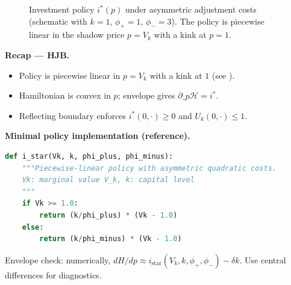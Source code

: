 \documentclass[11pt,letterpaper,oneside]{article}
\numberwithin{equation}{section}
\newcommand{\1}{\mathbf{1}}
\begin{document}
\begin{figure}[ht]
\centering
{}
\caption{Investment policy $i^*(p)$ under asymmetric adjustment costs (schematic with $k=1$, $\phi_+=1$, $\phi_-=3$). The policy is piecewise linear in the shadow price $p=V_k$ with a kink at $p=1$.}
\label{fig:policy_ip}
\end{figure}

\begin{tcolorbox}[didacticstyle]
\textbf{Recap --- HJB.}
\begin{itemize}[leftmargin=1.15em,itemsep=0.2em]
  \item Policy is piecewise linear in $p=V_k$ with a kink at $1$ (see ).
  \item Hamiltonian is convex in $p$; envelope gives $\partial\_p\mathcal H=i^*$.
  \item Reflecting boundary enforces $i^*(0,\cdot)\ge0$ and $U_k(0,\cdot)\le1$.
\end{itemize}
\end{tcolorbox}

\begin{tcolorbox}[didacticstyle]
\textbf{Minimal policy implementation (reference).}
\begin{lstlisting}[language=Python]
def i_star(Vk, k, phi_plus, phi_minus):
    """Piecewise-linear policy with asymmetric quadratic costs.
    Vk: marginal value V_k, k: capital level
    """
    if Vk >= 1.0:
        return (k/phi_plus) * (Vk - 1.0)
    else:
        return (k/phi_minus) * (Vk - 1.0)
\end{lstlisting}
Envelope check: numerically, \(dH/dp \approx i_{\mathrm{star}}(V_k,k,\phi_+,\phi_-) - \delta k\). Use central differences for diagnostics.
\end{tcolorbox}
\end{document}
